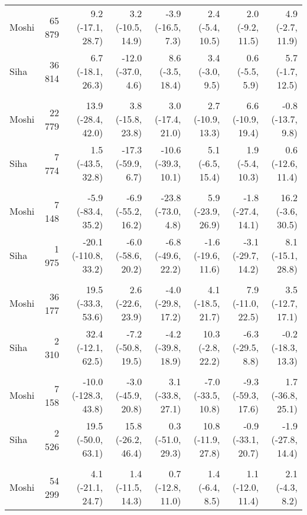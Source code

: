 \begin{table}[t]
\begin{tabular*}{\linewidth}{@{\extracolsep{\fill}}l|rrrrrrr}
\midrule\addlinespace[2.5pt]
Moshi & 65 879 & 9.2 (-17.1, 28.7)  & 3.2 (-10.5, 14.9)  & -3.9 (-16.5, 7.3)  & 2.4 (-5.4, 10.5)  & 2.0 (-9.2, 11.5)  & 4.9 (-2.7, 11.9)  \\ 
Siha & 36 814 & 6.7 (-18.1, 26.3)  & -12.0 (-37.0, 4.6)  & 8.6 (-3.5, 18.4)  & 3.4 (-3.0, 9.5)  & 0.6 (-5.5, 5.9)  & 5.7 (-1.7, 12.5)  \\ 
\midrule\addlinespace[2.5pt]
\multicolumn{8}{l}{Epilepsy} \\[2.5pt] 
\midrule\addlinespace[2.5pt]
Moshi & 22 779 & 13.9 (-28.4, 42.0)  & 3.8 (-15.8, 23.8)  & 3.0 (-17.4, 21.0)  & 2.7 (-10.9, 13.3)  & 6.6 (-10.9, 19.4)  & -0.8 (-13.7, 9.8)  \\ 
Siha & 7 774 & 1.5 (-43.5, 32.8)  & -17.3 (-59.9, 6.7)  & -10.6 (-39.3, 10.1)  & 5.1 (-6.5, 15.4)  & 1.9 (-5.4, 10.3)  & 0.6 (-12.6, 11.4)  \\ 
\midrule\addlinespace[2.5pt]
\multicolumn{8}{l}{Neuroses} \\[2.5pt] 
\midrule\addlinespace[2.5pt]
Moshi & 7 148 & -5.9 (-83.4, 35.2)  & -6.9 (-55.2, 16.2)  & -23.8 (-73.0, 4.8)  & 5.9 (-23.9, 26.9)  & -1.8 (-27.4, 14.1)  & 16.2 (-3.6, 30.5)  \\ 
Siha & 1 975 & -20.1 (-110.8, 33.2)  & -6.0 (-58.6, 20.2)  & -6.8 (-49.6, 22.2)  & -1.6 (-19.6, 11.6)  & -3.1 (-29.7, 14.2)  & 8.1 (-15.1, 28.8)  \\ 
\midrule\addlinespace[2.5pt]
\multicolumn{8}{l}{Psychoses} \\[2.5pt] 
\midrule\addlinespace[2.5pt]
Moshi & 36 177 & 19.5 (-33.3, 53.6)  & 2.6 (-22.6, 23.9)  & -4.0 (-29.8, 17.2)  & 4.1 (-18.5, 21.7)  & 7.9 (-11.0, 22.5)  & 3.5 (-12.7, 17.1)  \\ 
Siha & 2 310 & 32.4 (-12.1, 62.5)  & -7.2 (-50.8, 19.5)  & -4.2 (-39.8, 18.9)  & 10.3 (-2.8, 22.2)  & -6.3 (-29.5, 8.8)  & -0.2 (-18.3, 13.3)  \\ 
\midrule\addlinespace[2.5pt]
\multicolumn{8}{l}{Dysentery} \\[2.5pt] 
\midrule\addlinespace[2.5pt]
Moshi & 7 158 & -10.0 (-128.3, 43.8)  & -3.0 (-45.9, 20.8)  & 3.1 (-33.8, 27.1)  & -7.0 (-33.5, 10.8)  & -9.3 (-59.3, 17.6)  & 1.7 (-36.8, 25.1)  \\ 
Siha & 2 526 & 19.5 (-50.0, 63.1)  & 15.8 (-26.2, 46.4)  & 0.3 (-51.0, 29.3)  & 10.8 (-11.9, 27.8)  & -0.9 (-33.1, 20.7)  & -1.9 (-27.8, 14.4)  \\ 
\midrule\addlinespace[2.5pt]
\multicolumn{8}{l}{Intestinal Worms} \\[2.5pt] 
\midrule\addlinespace[2.5pt]
Moshi & 54 299 & 4.1 (-21.1, 24.7)  & 1.4 (-11.5, 14.3)  & 0.7 (-12.8, 11.0)  & 1.4 (-6.4, 8.5)  & 1.1 (-12.0, 11.4)  & 2.1 (-4.3, 8.2)  \\ 

\end{tabular*}
\end{table}

